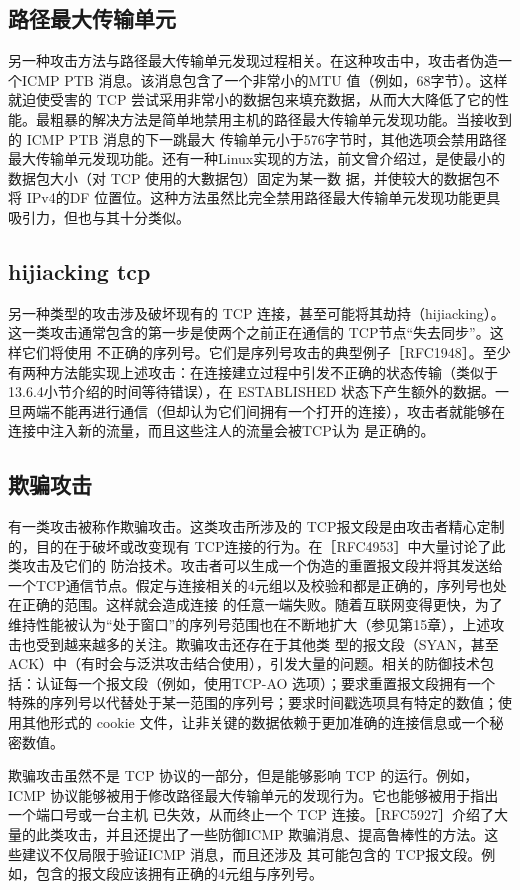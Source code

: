 \subsection{路径最大传输单元}
另一种攻击方法与路径最大传输单元发现过程相关。在这种攻击中，攻击者伪造一个ICMP PTB 消息。该消息包含了一个非常小的MTU 值（例如，68字节）。这样就迫使受害的
TCP 尝试采用非常小的数据包来填充数据，从而大大降低了它的性能。最粗暴的解决方法是简单地禁用主机的路径最大传输单元发现功能。当接收到的 ICMP PTB 消息的下一跳最大
传输单元小于576字节时，其他选项会禁用路径最大传输单元发现功能。还有一种Linux实现的方法，前文曾介绍过，是使最小的数据包大小（对 TCP 使用的大數据包）固定为某一数
据，并使较大的数据包不将 IPv4的DF 位置位。这种方法虽然比完全禁用路径最大传输单元发现功能更具吸引力，但也与其十分类似。

\subsection{hijiacking tcp}
另一种类型的攻击涉及破坏现有的 TCP 连接，甚至可能将其劫持（hijiacking）。这一类攻击通常包含的第一步是使两个之前正在通信的 TCP节点“失去同步”。这样它们将使用
不正确的序列号。它们是序列号攻击的典型例子［RFC1948］。至少有两种方法能实现上述攻击：在连接建立过程中引发不正确的状态传输（类似于13.6.4小节介绍的时间等待错误），在
ESTABLISHED 状态下产生额外的数据。一旦两端不能再进行通信（但却认为它们间拥有一个打开的连接），攻击者就能够在连接中注入新的流量，而且这些注人的流量会被TCP认为
是正确的。

\subsection{欺骗攻击}
有一类攻击被称作欺骗攻击。这类攻击所涉及的 TCP报文段是由攻击者精心定制的，目的在于破坏或改变现有 TCP连接的行为。在［RFC4953］中大量讨论了此类攻击及它们的
防治技术。攻击者可以生成一个伪造的重置报文段并将其发送给一个TCP通信节点。假定与连接相关的4元组以及校验和都是正确的，序列号也处在正确的范围。这样就会造成连接
的任意一端失败。随着互联网变得更快，为了维持性能被认为“处于窗口”的序列号范围也在不断地扩大（参见第15章），上述攻击也受到越来越多的关注。欺骗攻击还存在于其他类
型的报文段（SYAN，甚至 ACK）中（有时会与泛洪攻击结合使用），引发大量的问题。相关的防御技术包括：认证每一个报文段（例如，使用TCP-AO 选项）；要求重置报文段拥有一个
特殊的序列号以代替处于某一范围的序列号；要求时间戳选项具有特定的数值；使用其他形式的 cookie 文件，让非关键的数据依赖于更加准确的连接信息或一个秘密数值。

欺骗攻击虽然不是 TCP 协议的一部分，但是能够影响 TCP 的运行。例如，ICMP 协议能够被用于修改路径最大传输单元的发现行为。它也能够被用于指出一个端口号或一台主机
已失效，从而终止一个 TCP 连接。［RFC5927］介绍了大量的此类攻击，并且还提出了一些防御ICMP 欺骗消息、提高鲁棒性的方法。这些建议不仅局限于验证ICMP 消息，而且还涉及
其可能包含的 TCP报文段。例如，包含的报文段应该拥有正确的4元组与序列号。
